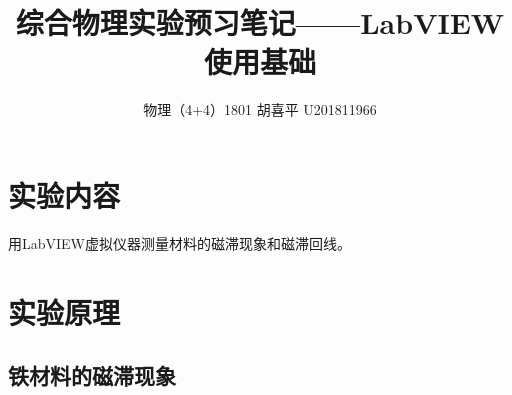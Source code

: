 \documentclass{article}
\author{物理（4+4）1801 \quad  胡喜平 \quad U201811966}
\affil{个人网站 https://hxp.plus/ \quad 电子邮件 hxp201406@gmail.com}
\title{综合物理实验预习笔记——LabVIEW 使用基础}
\begin{document}
\maketitle\thispagestyle{fancy}

\section{实验内容}

用LabVIEW虚拟仪器测量材料的磁滞现象和磁滞回线。

\section{实验原理}

\subsection{铁材料的磁滞现象}
\end{document}
